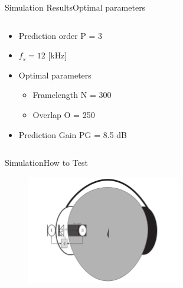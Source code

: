 \begin{frame}{Simulation Results}{Optimal parameters}		
\begin{columns}
	\begin{column}{0.4\textwidth}
	\begin{itemize}
		\item Prediction order P = 3
		\item $f_s = 12$ [kHz]
		\item Optimal parameters
		\begin{itemize}
			\item Framelength N = 300
			\item Overlap O = 250
		\end{itemize}
		\item Prediction Gain PG = 8.5 dB
	\end{itemize}
	\end{column}
	\begin{column}{0.6\textwidth} 
		\resizebox{0.9\columnwidth}{!}{		
			}
	\end{column}
\end{columns}
\end{frame}


\begin{frame}{Simulation}{How to Test}	
\begin{figure}[H]
	\centering
	\includegraphics[width=0.6\textwidth]{figures/SystemOverview}
\end{figure}  
\end{frame}

